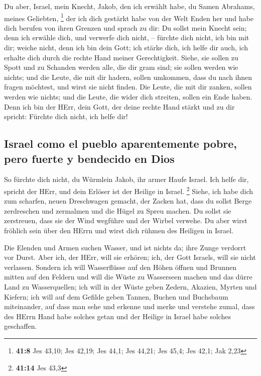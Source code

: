  Du aber, Israel, mein Knecht, Jakob, den ich erwählt
habe, du Samen Abrahams, meines Geliebten, \footnote{\textbf{41:8} Jes
  43,10; Jes 42,19; Jes 44,1; Jes 44,21; Jes 45,4; Jes 42,1; Jak 2,23}
 der ich dich gestärkt habe von der Welt Enden her und
habe dich berufen von ihren Grenzen und sprach zu dir: Du sollst mein
Knecht sein; denn ich erwähle dich, und verwerfe dich nicht, --
 fürchte dich nicht, ich bin mit dir; weiche nicht, denn
ich bin dein Gott; ich stärke dich, ich helfe dir auch, ich erhalte dich
durch die rechte Hand meiner Gerechtigkeit.  Siehe, sie
sollen zu Spott und zu Schanden werden alle, die dir gram sind; sie
sollen werden wie nichts; und die Leute, die mit dir hadern, sollen
umkommen,  dass du nach ihnen fragen möchtest, und wirst
sie nicht finden. Die Leute, die mit dir zanken, sollen werden wie
nichts; und die Leute, die wider dich streiten, sollen ein Ende haben.
 Denn ich bin der HErr, dein Gott, der deine rechte Hand
stärkt und zu dir spricht: Fürchte dich nicht, ich helfe dir!

\hypertarget{israel-como-el-pueblo-aparentemente-pobre-pero-fuerte-y-bendecido-en-dios}{%
\subsection{Israel como el pueblo aparentemente pobre, pero fuerte y
bendecido en
Dios}\label{israel-como-el-pueblo-aparentemente-pobre-pero-fuerte-y-bendecido-en-dios}}

 So fürchte dich nicht, du Würmlein Jakob, ihr armer
Haufe Israel. Ich helfe dir, spricht der HErr, und dein Erlöser ist der
Heilige in Israel. \footnote{\textbf{41:14} Jes 43,3} 
Siehe, ich habe dich zum scharfen, neuen Dreschwagen gemacht, der Zacken
hat, dass du sollst Berge zerdreschen und zermalmen und die Hügel zu
Spreu machen.  Du sollst sie zerstreuen, dass sie der
Wind wegführe und der Wirbel verwehe. Du aber wirst fröhlich sein über
den HErrn und wirst dich rühmen des Heiligen in Israel.

 Die Elenden und Armen suchen Wasser, und ist nichts da;
ihre Zunge verdorrt vor Durst. Aber ich, der HErr, will sie erhören;
ich, der Gott Israels, will sie nicht verlassen.  Sondern
ich will Wasserflüsse auf den Höhen öffnen und Brunnen mitten auf den
Feldern und will die Wüste zu Wasserseen machen und das dürre Land zu
Wasserquellen;  ich will in der Wüste geben Zedern,
Akazien, Myrten und Kiefern; ich will auf dem Gefilde geben Tannen,
Buchen und Buchsbaum miteinander,  auf dass man sehe und
erkenne und merke und verstehe zumal, dass des HErrn Hand habe solches
getan und der Heilige in Israel habe solches geschaffen.

